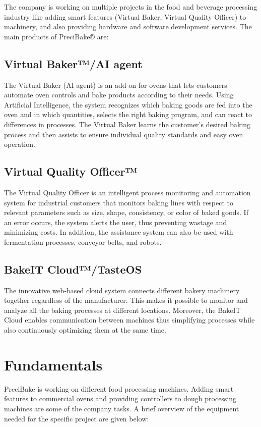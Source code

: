 \documentclass{listhesis}
\begin{document}
The company is working on multiple projects in the food and beverage processing industry like adding smart features (Virtual Baker, Virtual Quality Officer) to machinery, and also providing hardware and software development services. The main products of PreciBake® are: \\

\subsection{Virtual Baker™/AI agent}
The Virtual Baker (AI agent) is an add-on for ovens that lets customers automate oven controls and bake products according to their needs. Using Artificial Intelligence, the system recognizes
which baking goods are fed into the oven and in which quantities, selects the right baking program, and can react to differences in processes. The Virtual Baker learns the customer’s
desired baking process and then assists to ensure individual quality standards and easy oven operation.

\subsection{Virtual Quality Officer™}
The Virtual Quality Officer is an intelligent process monitoring and automation system for industrial customers that monitors baking lines with respect to relevant parameters such as size,
shape, consistency, or color of baked goods. If an error occurs, the system alerts the user, thus preventing wastage and minimizing costs. In addition, the assistance system can also be used
with fermentation processes, conveyor belts, and robots.

\subsection{BakeIT Cloud™/TasteOS}
The innovative web-based cloud system connects different bakery machinery together regardless of the manufacturer. This makes it possible to monitor and analyze all the baking processes at different locations. Moreover, the BakeIT Cloud enables communication between machines thus simplifying processes while also continuously optimizing them at the same time.
\newpage
\section{Fundamentals}

PreciBake is working on different food processing machines. Adding smart features to commercial ovens and providing controllers to dough processing machines are some of the company tasks. 
A brief overview of the equipment needed for the specific project are given below:
\end{document}
